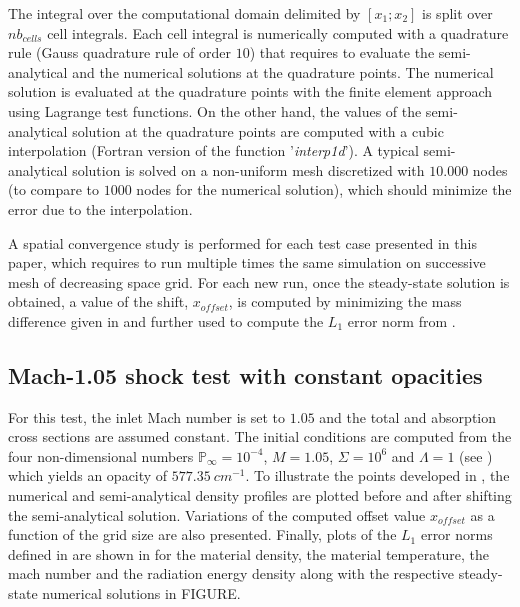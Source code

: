 \documentclass[times,doublespace]{fldauth}%
\begin{document}
%
The integral over the computational domain delimited by $[x_1; x_2]$ is split over $nb_{cells}$ cell integrals. Each cell integral is numerically computed with a quadrature rule (Gauss quadrature rule of order $10$) that requires to evaluate the semi-analytical and the numerical solutions at the quadrature points. The numerical solution is evaluated at the quadrature points with the finite element approach using Lagrange test functions. On the other hand, the values of the semi-analytical solution at the quadrature points are computed with a cubic interpolation (Fortran version of the function '\emph{interp1d}'). A typical semi-analytical solution is solved on a non-uniform mesh discretized with $10.000$ nodes (to compare to $1000$ nodes for the numerical solution), which should minimize the error due to the interpolation.

A spatial convergence study is performed for each test case presented in this paper, which requires to run multiple times the same simulation on successive mesh of decreasing space grid. For each new run, once the steady-state solution is obtained, a value of the shift, $x_{offset}$, is computed by minimizing the mass difference given in  and further used to compute the $L_1$ error norm from .
%
\subsection{Mach-1.05 shock test with constant opacities}\label{sec:mach-1p05-cst-xs}
%
For this test, the inlet Mach number is set to $1.05$ and the total and absorption cross sections are assumed constant. The initial conditions are computed from the four non-dimensional numbers $\mathbb{P}_\infty=10^{-4}$, $M=1.05$, $\mathbb{\Sigma}=10^6$ and $\mathbb{\Lambda}=1$ (see ) which yields an opacity of $577.35 \ cm^{-1}$. To illustrate the points developed in , the numerical and semi-analytical density profiles are plotted before and after shifting the semi-analytical solution. Variations of the computed offset value $x_{offset}$ as a function of the grid size are also presented. Finally, plots of the $L_1$ error norms defined in  are shown in  for the material density, the material temperature, the mach number and the radiation energy density along with the respective steady-state numerical solutions in FIGURE.
\end{document}
